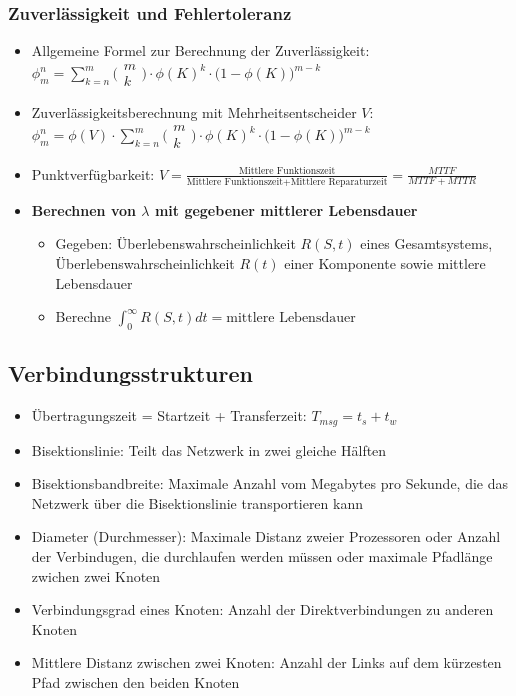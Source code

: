 \subsubsection{Zuverlässigkeit und Fehlertoleranz}
\begin{itemize}
	\item Allgemeine Formel zur Berechnung der Zuverlässigkeit: \(\phi^n_m = \sum_{k=n}^m \Big(\begin{array}{c}m\\k\end{array}\Big) \cdot \phi(K)^k \cdot \big(1-\phi(K)\big)^{m-k}\)
	\item Zuverlässigkeitsberechnung mit Mehrheitsentscheider \(V\): \(\phi^n_m = \phi(V) \cdot \sum_{k=n}^m \Big(\begin{array}{c}m\\k\end{array}\Big) \cdot \phi(K)^k \cdot \big(1-\phi(K)\big)^{m-k}\)
	\item Punktverfügbarkeit: \(V = \frac{\text{Mittlere Funktionszeit}}{\text{Mittlere Funktionszeit} + \text{Mittlere Reparaturzeit}} = \frac{MTTF}{MTTF + MTTR}\)
	\item \textbf{Berechnen von \(\lambda\) mit gegebener mittlerer Lebensdauer}
	\begin{itemize}
		\item Gegeben: Überlebenswahrscheinlichkeit \(R(S,t)\) eines Gesamtsystems, Überlebenswahrscheinlichkeit \(R(t)\) einer Komponente sowie mittlere Lebensdauer
		\item Berechne \(\int_0^{\infty}R(S,t)dt= \text{mittlere Lebensdauer}\)
	\end{itemize}
\end{itemize}


\subsection{Verbindungsstrukturen}
\begin{itemize}
	\item Übertragungszeit = Startzeit + Transferzeit: \(T_{msg} = t_s + t_w\)
	\item Bisektionslinie: Teilt das Netzwerk in zwei gleiche Hälften
	\item Bisektionsbandbreite: Maximale Anzahl vom Megabytes pro Sekunde, die das Netzwerk über die Bisektionslinie transportieren kann
	\item Diameter (Durchmesser): Maximale Distanz zweier Prozessoren oder Anzahl der Verbindugen, die durchlaufen werden müssen oder maximale Pfadlänge zwichen zwei Knoten
	\item Verbindungsgrad eines Knoten: Anzahl der Direktverbindungen zu anderen Knoten
	\item Mittlere Distanz zwischen zwei Knoten: Anzahl der Links auf dem kürzesten Pfad zwischen den beiden Knoten
\end{itemize}
